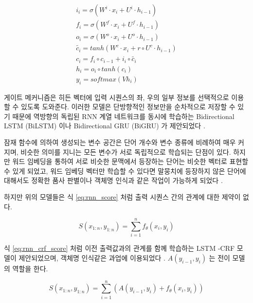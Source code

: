\documentclass[11pt]{article}
\begin{document}
\begin{equation}
  \label{eq:lstm}
  \begin{aligned}
  i_i = \sigma(W^i \cdot x_i + U^i \cdot h_{i-1}) \\
  f_i = \sigma(W^f \cdot x_i + U^f \cdot h_{i-1}) \\
  o_i = \sigma(W^o \cdot x_i + U^o \cdot h_{i-1}) \\
  \tilde{c_i} = tanh \left( W^c \cdot x_i + r \circ U^c \cdot h_{i-1}\right) \\
  c_i = f_i \circ c_{i-1} + i_i \circ \tilde{c_i} \\
  h_i = o_i \circ tanh (c_i) \\
  y_i = softmax(Vh_i)
  \end{aligned}
\end{equation}

게이트 메커니즘은 히든 벡터에 입력 시퀀스의 좌, 우의 일부 정보를 선택적으로 이용할 수 있도록 도와준다.
이러한 모델은 단방향적인 정보만을 순차적으로 저장할 수 있기 때문에 역방향의 독립된 RNN 계열 네트워크를 동시에 학습하는 Bidirectional LSTM (BiLSTM) 이나 Bidirectional GRU (BiGRU) 가 제안되었다 \citep{graves2005bidirectional}.

잠재 함수에 의하여 생성되는 변수 공간은 단어 개수와 변수 종류에 비례하여 매우 커지며, 비슷한 의미를 지니는 모든 변수가 서로 독립적으로 학습되는 단점이 있다.
하지만 워드 임베딩을 통하여 서로 비슷한 문맥에서 등장하는 단어는 비슷한 벡터로 표현할 수 있게 되었고, 워드 임베딩 벡터만 학습할 수 있다면 말뭉치에 등장하지 않은 단어에 대해서도 정확한 품사 판별이나 객체명 인식과 같은 작업이 가능하게 되었다 \citep{collobert2011natural, lample2016neural}.

하지만 위의 모델들은 식 \ref{eq:rnn_score} 처럼 출력 시퀀스 간의 관계에 대한 제약이 없다.

\begin{equation}
  \label{eq:rnn_score}
  S(x_{1:n}, y_{1:n}) = \sum_{i=1}^n f_\theta(x_i, y_i)
\end{equation}

식 \ref{eq:rnn_crf_score} 처럼 이전 출력값과의 관계를 함께 학습하는 LSTM -CRF 모델이 제안되었으며, 객체명 인식같은 과업에 이용되었다 \citep{lample2016neural}.
$A(y_{i-1}, y_i)$ 는 전이 모델의 역할을 한다.

\begin{equation}
  \label{eq:rnn_crf_score}
  S(x_{1:n}, y_{1:n}) = \sum_{i=1}^n \left( A(y_{i-1}, y_i) + f_\theta(x_i, y_i) \right)
\end{equation}
\end{document}
